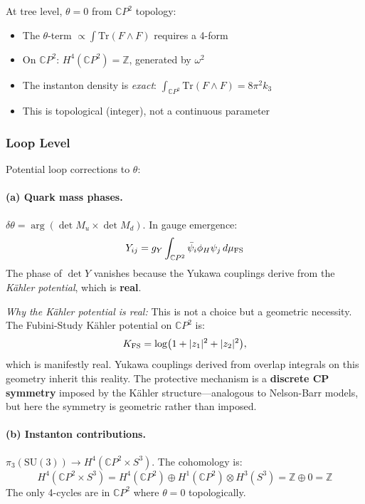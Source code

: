 At tree level, $\theta = 0$ from $\mathbb{C}P^2$ topology:
\begin{itemize}
\item The $\theta$-term $\propto \int \text{Tr}(F \wedge F)$ requires a 4-form
\item On $\mathbb{C}P^2$: $H^4(\mathbb{C}P^2) = \mathbb{Z}$, generated by $\omega^2$
\item The instanton density is \textit{exact}: $\int_{\mathbb{C}P^2} \text{Tr}(F \wedge F) = 8\pi^2 k_3$
\item This is topological (integer), not a continuous parameter
\end{itemize}

\subsubsection{Loop Level}

Potential loop corrections to $\theta$:

\paragraph{(a) Quark mass phases.}
$\delta\theta = \arg(\det M_u \times \det M_d)$. In gauge emergence:
\begin{equation}
Y_{ij} = g_Y \int_{\mathbb{C}P^2} \bar{\psi}_i \phi_H \psi_j \, d\mu_{\rm FS}
\end{equation}
The phase of $\det Y$ vanishes because the Yukawa couplings derive from the \textit{K\"ahler potential}, which is \textbf{real}.

\textit{Why the K\"ahler potential is real:} This is not a choice but a geometric necessity. The Fubini-Study K\"ahler potential on $\mathbb{C}P^2$ is:
\begin{equation}
K_{\rm FS} = \log(1 + |z_1|^2 + |z_2|^2),
\end{equation}
which is manifestly real. Yukawa couplings derived from overlap integrals on this geometry inherit this reality. The protective mechanism is a \textbf{discrete CP symmetry} imposed by the K\"ahler structure---analogous to Nelson-Barr models, but here the symmetry is geometric rather than imposed.

\paragraph{(b) Instanton contributions.}
$\pi_3(\text{SU}(3)) \to H^4(\mathbb{C}P^2 \times S^3)$. The cohomology is:
\begin{equation}
H^4(\mathbb{C}P^2 \times S^3) = H^4(\mathbb{C}P^2) \oplus H^1(\mathbb{C}P^2) \otimes H^3(S^3) = \mathbb{Z} \oplus 0 = \mathbb{Z}
\end{equation}
The only 4-cycles are in $\mathbb{C}P^2$ where $\theta = 0$ topologically.

